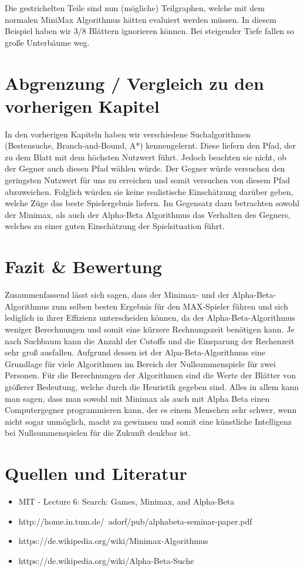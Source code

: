 Die gestrichelten Teile sind nun (mögliche) Teilgraphen, welche mit dem normalen MiniMax Algorithmus hätten evaluiert werden müssen. In diesem Beispiel haben wir 3/8 Blättern ignorieren können. Bei steigender Tiefe fallen so große Unterbäume weg.

\section{Abgrenzung / Vergleich zu den vorherigen Kapitel}

In den vorherigen Kapiteln haben wir verschiedene Suchalgorithmen (Bestensuche, Branch-and-Bound, A*) kennengelernt. Diese liefern den Pfad, der zu dem Blatt mit dem höchsten Nutzwert führt. Jedoch beachten sie nicht, ob der Gegner auch diesen Pfad wählen würde. Der Gegner würde versuchen den geringsten Nutzwert für uns zu erreichen und somit versuchen von diesem Pfad abzuweichen. Folglich würden sie keine realistische Einschätzung darüber geben, welche Züge das beste Spielergebnis liefern. Im Gegensatz dazu betrachten sowohl der Minimax, als auch der Alpha-Beta Algorithmus das Verhalten des Gegners, welches zu einer guten Einschätzung der Spielsituation führt.



\section{Fazit \& Bewertung}

Zusammenfassend lässt sich sagen, dass der Minimax- und der Alpha-Beta-Algorithmus zum selben besten Ergebnis für den MAX-Spieler führen und sich lediglich in ihrer Effizienz unterscheiden können, da der Alpha-Beta-Algorithmus weniger Berechnungen und somit eine kürzere Rechnungszeit benötigen kann. Je nach Suchbaum kann die Anzahl der Cutoffs und die Einsparung der Rechenzeit sehr groß ausfallen. Aufgrund dessen ist der Alpa-Beta-Algorithmus eine Grundlage für viele Algorithmen im Bereich der Nullsummenspiele für zwei Personen. Für die Berechnungen der Algorithmen sind die Werte der Blätter von größerer Bedeutung, welche durch die Heuristik gegeben sind. Alles in allem kann man sagen, dass man sowohl mit Minimax als auch mit Alpha Beta einen Computergegner programmieren kann, der es einem Menschen sehr schwer, wenn nicht sogar unmöglich, macht zu gewinnen und somit eine künstliche Intelligenz bei Nullsummenspielen für die Zukunft denkbar ist.


\section{Quellen und Literatur}

\begin{itemize}
\item MIT - Lecture 6: Search: Games, Minimax, and Alpha-Beta
\item http://home.in.tum.de/~adorf/pub/alphabeta-seminar-paper.pdf
\item https://de.wikipedia.org/wiki/Minimax-Algorithmus
\item https://de.wikipedia.org/wiki/Alpha-Beta-Suche
\end{itemize}

